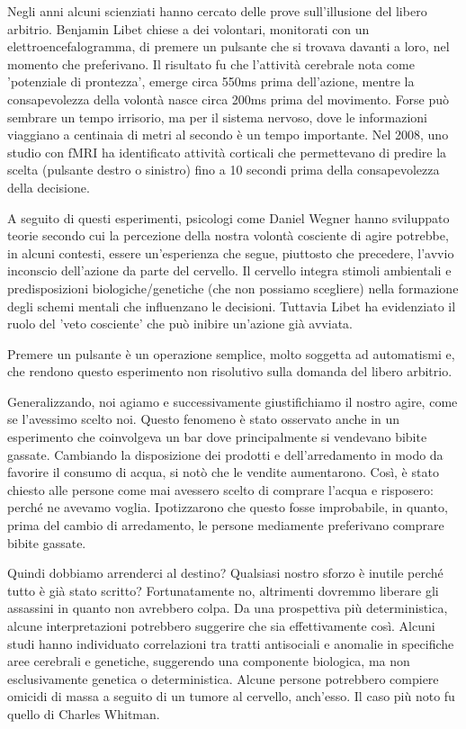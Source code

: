 \documentclass[12pt]{book} %
\begin{document}
Negli anni alcuni scienziati hanno cercato delle prove sull'illusione del libero arbitrio.
Benjamin Libet chiese a dei volontari, monitorati con un elettroencefalogramma, di premere un pulsante che si trovava davanti a loro, nel momento che preferivano. Il risultato fu che l'attività cerebrale nota come 'potenziale di prontezza', emerge circa 550ms prima dell’azione, mentre la consapevolezza della volontà nasce circa 200ms prima del movimento.
Forse può sembrare un tempo irrisorio, ma per il sistema nervoso, dove le informazioni viaggiano a centinaia di metri al secondo è un tempo importante. Nel 2008, uno studio con fMRI ha identificato attività corticali che permettevano di predire la scelta (pulsante destro o sinistro) fino a 10 secondi prima della consapevolezza della decisione.
 
A seguito di questi esperimenti, psicologi come Daniel Wegner hanno sviluppato teorie secondo cui la percezione della nostra volontà cosciente di agire potrebbe, in alcuni contesti, essere un'esperienza che segue, piuttosto che precedere, l'avvio inconscio dell'azione da parte del cervello.
Il cervello integra stimoli ambientali e predisposizioni biologiche/genetiche (che non possiamo scegliere) nella formazione degli schemi mentali che influenzano le decisioni. Tuttavia Libet ha evidenziato il ruolo del 'veto cosciente' che può inibire un'azione già avviata.

Premere un pulsante è un operazione semplice, molto soggetta ad automatismi e, che rendono questo esperimento non risolutivo sulla domanda del libero arbitrio.

Generalizzando, noi agiamo e successivamente giustifichiamo il nostro agire, come se l'avessimo scelto noi. Questo fenomeno è stato osservato anche in un esperimento che coinvolgeva un bar dove principalmente si vendevano bibite gassate. Cambiando la disposizione dei prodotti e dell'arredamento in modo da
favorire il consumo di acqua, si notò che le vendite aumentarono. Così, è stato chiesto alle persone come mai avessero scelto di comprare l'acqua e risposero: perché ne avevamo voglia. Ipotizzarono che questo fosse improbabile, in quanto, prima del cambio di arredamento, le persone mediamente preferivano comprare bibite gassate. 

Quindi dobbiamo arrenderci al destino? Qualsiasi nostro sforzo è inutile perché tutto è già stato scritto?
Fortunatamente no, altrimenti dovremmo liberare gli assassini in quanto non avrebbero colpa. Da una prospettiva più deterministica, alcune interpretazioni potrebbero suggerire che sia effettivamente così. Alcuni studi hanno individuato correlazioni tra tratti antisociali e anomalie in specifiche aree cerebrali e genetiche, suggerendo una componente biologica, ma non esclusivamente genetica o deterministica. 
Alcune persone potrebbero compiere omicidi di massa a seguito di un tumore al cervello, anch'esso. Il caso più noto fu quello di Charles Whitman.
\end{document}
